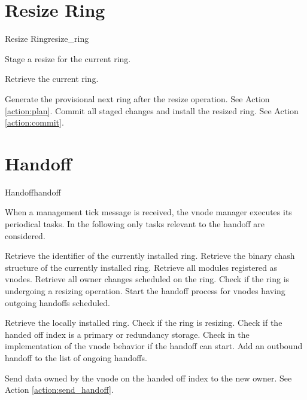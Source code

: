 \section{Resize Ring}
\begin{actionbox}{Resize Ring}{resize_ring}
	\begin{action}
		 Stage a resize for the current ring.
		\begin{action}
			 Retrieve the current ring.
		\end{action}
		 Generate the provisional next ring after the resize operation. See Action \ref{action:plan}.
		 Commit all staged changes and install the resized ring. See Action \ref{action:commit}.
	\end{action}
\end{actionbox}

\section{Handoff}
\begin{actionbox}{Handoff}{handoff}
	\begin{action}
		 When a management tick message is received, the vnode manager executes its periodical tasks.
		In the following only tasks relevant to the handoff are considered.
		\begin{action}
			 Retrieve the identifier of the currently installed ring.
			 Retrieve the binary chash structure of the currently installed ring.
			 Retrieve all modules registered as vnodes.
			 Retrieve all owner changes scheduled on the ring.
			 Check if the ring is undergoing a resizing operation.
			 Start the handoff process for vnodes having outgoing handoffs scheduled.
			\begin{action}
				 Retrieve the locally installed ring.
				 Check if the ring is resizing.
				 Check if the handed off index is a primary or redundancy storage.
				 Check in the implementation of the vnode behavior if the handoff can start.
				 Add an outbound handoff to the list of ongoing handoffs.
				\begin{action}
					 Send data owned by the vnode on the handed off index to the new owner. See Action \ref{action:send_handoff}.
				\end{action}
			\end{action}
		\end{action}
	\end{action}
\end{actionbox}

